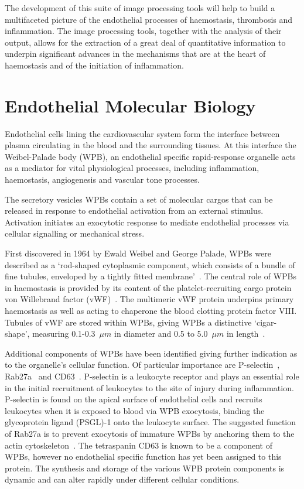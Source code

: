 The development of this suite of image processing tools will help to build a multifaceted picture of the endothelial processes of haemostasis, thrombosis and inflammation. The image processing tools, together with the analysis of their output, allows for the extraction of a great deal of quantitative information to underpin significant advances in the mechanisms that are at the heart of haemostasis and of the initiation of inflammation.

\section{Endothelial Molecular Biology}
Endothelial cells lining the cardiovascular system form the interface between plasma circulating in the blood and the surrounding tissues. At this interface the Weibel-Palade body (WPB), an endothelial specific rapid-response organelle acts as a mediator for vital physiological processes, including inflammation, haemostasis, angiogenesis and vascular tone processes.

The secretory vesicles WPBs contain a set of molecular cargos that can be released in response to endothelial activation from an external stimulus. Activation initiates an exocytotic response to mediate endothelial processes via cellular signalling or mechanical stress.

First discovered in 1964 by Ewald Weibel and George Palade, WPBs were described as a `rod-shaped cytoplasmic component, which consists of a bundle of fine tubules, enveloped by a tightly fitted membrane'~\cite{Weibel1964}. The central role of WPBs in haemostasis is provided by its content of the platelet-recruiting cargo protein von Willebrand factor (vWF)~\cite{Wagner1982}. The multimeric vWF protein underpins primary haemostasis as well as acting to chaperone the blood clotting protein factor VIII. Tubules of vWF are stored within WPBs, giving WPBs a distinctive `cigar-shape', measuring 0.1-0.3~$\mu m$ in diameter and 0.5 to 5.0~$\mu m$ in length~\cite{Ferraro2014}.

Additional components of WPBs have been identified giving further indication as to the organelle's cellular function. Of particular importance are P-selectin~\cite{Bonfanti1989,McEver1989}, Rab27a~\cite{Hannah2003} and CD63~\cite{Vischer1993}. P-selectin is a leukocyte receptor and plays an essential role in the initial recruitment of leukocytes to the site of injury during inflammation. P-selectin is found on the apical surface of endothelial cells and recruits leukocytes when it is exposed to blood via WPB exocytosis, binding the glycoprotein ligand (PSGL)-1 onto the leukocyte surface. The suggested function of Rab27a is to prevent exocytosis of immature WPBs by anchoring them to the actin cytoskeleton~\cite{Nightingale2009}. The tetraspanin CD63 is known to be a component of WPBs, however no endothelial specific function has yet been assigned to this protein. The synthesis and storage of the various WPB protein components is dynamic and can alter rapidly under different cellular conditions.

